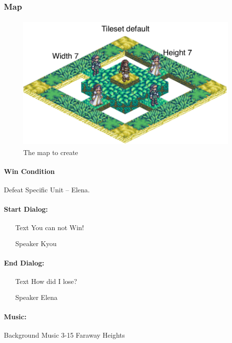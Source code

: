 \clearpage
\subsubsection*{Map}
\begin{figure}[h!]
	\centering
		\includegraphics[height=2.7in]{figures/Task.pdf}
	\caption{The map to create}
	\label{fig:figures_Task}
\end{figure}


\paragraph{Win Condition\\}
Defeat Specific Unit   -- Elena.

\paragraph{Start Dialog:}
\begin{itemize}[topsep=0mm,noitemsep]
	\item[Text]  You can not Win!
	\item[Speaker] Kyou
\end{itemize}

\paragraph{End Dialog:}
\begin{itemize}[topsep=0mm,noitemsep]
	\item[Text]  How did I lose?
	\item[Speaker] Elena
\end{itemize}

\paragraph{Music:\\}
Background Music 3-15 Faraway Heights

